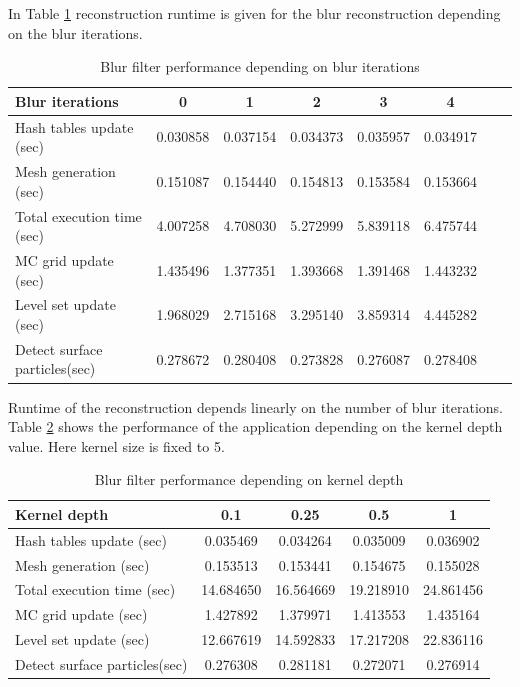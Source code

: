 In Table \ref{tab:bi_perf_analysis} reconstruction runtime is given for the blur reconstruction depending on the blur iterations. 
\begin{table}[H]
	\begin{center}
		\scriptsize
		\begin{tabular}{|l|c|c|c|c|c|c|c|}
			\hline
			Blur iterations & 0 & 1 & 2 & 3 & 4 \\
			\hline
			Hash tables update (sec)		&	0.030858	&	0.037154	&	0.034373	&	0.035957	&	0.034917\\
			Mesh generation	(sec)			&	0.151087	&	0.154440	&	0.154813	&	 0.153584	&	0.153664\\
			Total execution time (sec)		&	4.007258	&	4.708030	&	5.272999	&	5.839118	&	6.475744\\
			MC grid update (sec)			&	1.435496	&	1.377351	&	1.393668	&	1.391468	&	1.443232\\
			Level set update (sec)			&	1.968029	&	2.715168	&	3.295140	&	3.859314	&	4.445282\\
			Detect surface particles(sec)	&	0.278672	&	0.280408	&	0.273828	&	0.276087	&	0.278408\\
			\hline
		\end{tabular}
	\end{center}
	\caption{Blur filter performance depending on blur iterations}
	\label{tab:bi_perf_analysis}
\end{table}
Runtime of the reconstruction depends linearly on the number of blur iterations.\\

Table \ref{tab:kd_perf_analysis} shows the performance of the application depending on the kernel depth value. Here kernel size is fixed to 5.
\begin{table}[H]
	\begin{center}
		\scriptsize
		\begin{tabular}{|l|c|c|c|c|}
			\hline
			Kernel depth & 0.1 & 0.25 & 0.5 & 1 \\
			\hline
			Hash tables update (sec)		&	0.035469	&	0.034264	&	0.035009	&	0.036902\\
			Mesh generation	(sec)			&	0.153513	&	0.153441	&	0.154675	&	 0.155028\\
			Total execution time (sec)		&	14.684650	&	16.564669	&	19.218910	&	24.861456\\
			MC grid update (sec)			&	1.427892	&	1.379971	&	1.413553	&	1.435164\\
			Level set update (sec)			&	12.667619	&	14.592833	&	17.217208	&	22.836116\\
			Detect surface particles(sec)	&	0.276308	&	0.281181	&	0.272071	&	0.276914\\
			\hline
		\end{tabular}
	\end{center}
	\caption{Blur filter performance depending on kernel depth}
	\label{tab:kd_perf_analysis}
\end{table}

